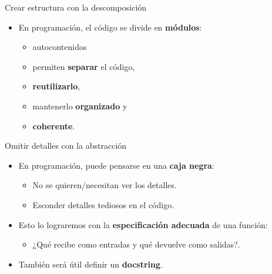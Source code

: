 \documentclass[mathserif]{beamer}
\begin{document}
\begin{frame}[fragile]{Crear estructura con la descomposición}
    \begin{itemize}
        \item En programación, el código se divide en {\blue\bfseries módulos}:
        \begin{itemize}
            \item {\orange autocontenidos}
            \item permiten {\orange\bfseries separar} el código,
            \item {\orange\bfseries reutilizarlo},
            \item mantenerlo {\orange\bfseries organizado} y 
            \item {\bfseries\orange coherente}.
        \end{itemize}
    \end{itemize}
    
\end{frame}

\begin{frame}[fragile]{Omitir detalles con la abstracción}
    \begin{itemize}
        \item En programación, puede pensarse en una {\blue\bfseries caja negra}: 
        \begin{itemize}
            \item No se quieren/necesitan ver los detalles.
            \item Esconder detalles tediosos en el código.
        \end{itemize}
        
        \item Esto lo lograremos con la {\bfseries\blue especificación adecuada} de una función:
        \begin{itemize}
            \item ¿Qué recibe como entradas y qué devuelve como salidas?.
        \end{itemize}
        
        \item También será útil definir un {\blue\bfseries docstring}.
    \end{itemize}
    
\end{frame}
\end{document}
